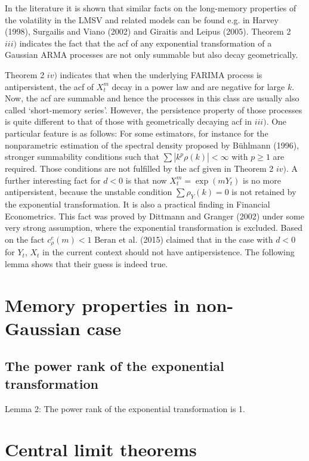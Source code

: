\documentclass[12pt]{article}
\begin{document}
In the literature it is shown that similar facts on the long-memory properties of the volatility in the LMSV and related models can be found e.g. in Harvey (1998), Surgailis and Viano (2002) and Giraitis and Leipus (2005). Theorem 2 $iii)$ indicates the fact that the acf of any exponential transformation of a Gaussian ARMA processes are not only summable but also decay geometrically. 

Theorem 2 $iv)$ indicates that when the underlying FARIMA process is antipersistent, the acf of $X_t^m$ decay in a power law and are negative for large $k$. Now, the acf are summable and hence the processes in this class are usually also called `short-memory series'. However, the persistence property of those processes is quite different to that of those with geometrically decaying acf in $iii)$. One particular feature is as follows: For some estimators, for instance for the nonparametric estimation of the spectral density proposed by B\"uhlmann (1996), stronger summability conditions such that $\sum|k^p\rho(k)|<\infty$ with $p\ge1$ are required. Those conditions are not fulfilled by the acf given in Theorem 2 $iv)$. 
A further interesting fact for $d<0$ is that now $X_t^m=\exp(mY_t)$ is no more antipersistent, because the unstable condition $\sum\rho_Y(k)=0$ is not retained by the exponential transformation. It is also a practical finding in Financial Econometrics. This fact was proved by Dittmann and Granger (2002) under some very strong assumption, where the exponential transformation is excluded. 
Based on the fact $c_{\rho}^e(m)<1$ Beran et al. (2015) claimed that in the case with $d<0$ for $Y_t$, $X_t$ in the current context should not have antipersistence. The following lemma shows that their guess is indeed true. 





\section{Memory properties in non-Gaussian case}


\subsection{The power rank of the exponential transformation}

Lemma 2: The power rank of the exponential transformation is 1.


\section{Central limit theorems}
\end{document}
